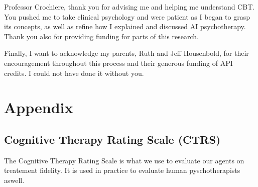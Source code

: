 \documentclass[twoside]{report}
\begin{document}
Professor Crochiere, thank you for advising me and helping me understand CBT. You pushed me to take clinical psychology and were patient as I began to grasp its concepts, as well as refine how I explained and discussed AI psychotherapy. Thank you also for providing funding for parts of this research.

Finally, I want to acknowledge my parents, Ruth and Jeff Housenbold, for their encouragement throughout this process and their generous funding of API credits. I could not have done it without you.

\chapter{Appendix}
\section{Cognitive Therapy Rating Scale (CTRS)}
The Cognitive Therapy Rating Scale is what we use to evaluate our agents on treatement fidelity. It is used in practice to evaluate human pyschotherapists aswell. \cite{beckinstitute2020ctrs}
\label{appendix:ctrs}




\end{document}
